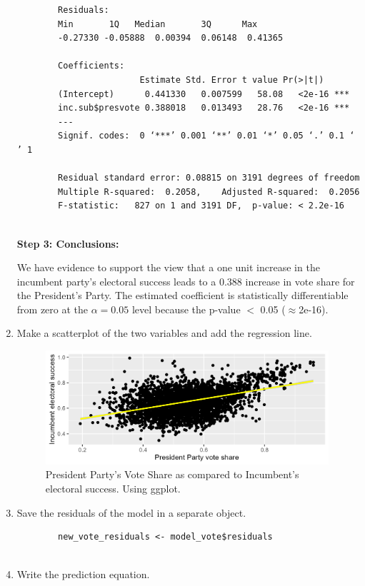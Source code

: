 \documentclass[12pt,letterpaper]{article}
\begin{document}
\begin{enumerate}
\begin{verbatim}
		Residuals:
		Min       1Q   Median       3Q      Max 
		-0.27330 -0.05888  0.00394  0.06148  0.41365 
		
		Coefficients:
		                Estimate Std. Error t value Pr(>|t|)    
		(Intercept)      0.441330   0.007599   58.08   <2e-16 ***
		inc.sub$presvote 0.388018   0.013493   28.76   <2e-16 ***
		---
		Signif. codes:  0 ‘***’ 0.001 ‘**’ 0.01 ‘*’ 0.05 ‘.’ 0.1 ‘ ’ 1
		
		Residual standard error: 0.08815 on 3191 degrees of freedom
		Multiple R-squared:  0.2058,	Adjusted R-squared:  0.2056 
		F-statistic:   827 on 1 and 3191 DF,  p-value: < 2.2e-16
		
	\end{verbatim}
	
	\textbf{Step 3: Conclusions:}
	
	We have evidence to support the view that a one unit increase in the incumbent party's electoral success leads to a 0.388 increase in vote share for the President's Party. The estimated coefficient is statistically differentiable from zero at the $\alpha=0.05$ level because the p-value $<$ 0.05 ($\approx $2e-16). \\
	
	
	\item Make a scatterplot of the two variables and add the regression line. 	
	
	  
	
	\begin{figure}[h!]
		\centering
		\caption{\footnotesize President Party's Vote Share as compared to Incumbent's electoral success. Using ggplot.}
		\includegraphics[width=0.99\textwidth]{vote_share2_scatter.png}
		
	\end{figure} 
	
	\newpage
	
	\item Save the residuals of the model in a separate object.	
	
	\begin{verbatim}
		new_vote_residuals <- model_vote$residuals
		
	\end{verbatim}
	
	
	\item Write the prediction equation.
	
\end{enumerate}		
\end{document}
